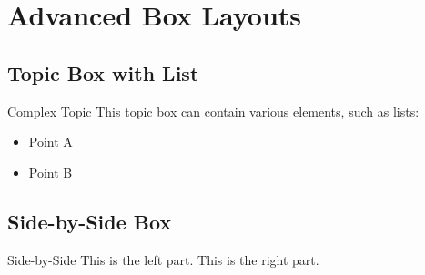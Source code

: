 \begingroup
\raggedright
\section{Advanced Box Layouts}


\subsection{Topic Box with List}
\begin{topicbox}{Complex Topic}
    This topic box can contain various elements, such as lists:
    \begin{itemize}
        \item Point A
        \item Point B
    \end{itemize}
\end{topicbox}


\subsection{Side-by-Side Box}
\begin{sidebysidebox}{Side-by-Side}
    This is the left part.
    \tcblower
    This is the right part.
\end{sidebysidebox}

\endgroup